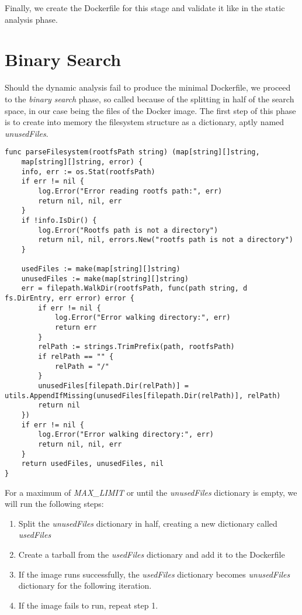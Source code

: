 Finally, we create the Dockerfile for this stage and validate it like in the static analysis phase.

\section{Binary Search}

Should the dynamic analysis fail to produce the minimal Dockerfile, we proceed to the \textit{binary search} phase, so called because of 
the splitting in half of the search space, in our case being the files of the Docker image.
The first step of this phase is to create into memory the filesystem structure as a dictionary, aptly named \textit{unusedFiles}.

\lstset{language=Go,caption=Filesystem parsing,label=lst:filesystem-parsing}
\begin{lstlisting}
func parseFilesystem(rootfsPath string) (map[string][]string,
	map[string][]string, error) {
	info, err := os.Stat(rootfsPath)
	if err != nil {
		log.Error("Error reading rootfs path:", err)
		return nil, nil, err
	}
	if !info.IsDir() {
		log.Error("Rootfs path is not a directory")
		return nil, nil, errors.New("rootfs path is not a directory")
	}

	usedFiles := make(map[string][]string)
	unusedFiles := make(map[string][]string)
	err = filepath.WalkDir(rootfsPath, func(path string, d fs.DirEntry, err error) error {
		if err != nil {
			log.Error("Error walking directory:", err)
			return err
		}
		relPath := strings.TrimPrefix(path, rootfsPath)
		if relPath == "" {
			relPath = "/"
		}
		unusedFiles[filepath.Dir(relPath)] = utils.AppendIfMissing(unusedFiles[filepath.Dir(relPath)], relPath)
		return nil
	})
	if err != nil {
		log.Error("Error walking directory:", err)
		return nil, nil, err
	}
	return usedFiles, unusedFiles, nil
}
\end{lstlisting}

For a maximum of \textit{MAX_LIMIT} or until the \textit{unusedFiles} dictionary is empty, we will run the following steps:
\begin{enumerate}
	\item Split the \textit{unusedFiles} dictionary in half, creating a new dictionary called \textit{usedFiles}
	\item Create a tarball from the \textit{usedFiles} dictionary and add it to the Dockerfile
	\item If the image runs successfully, the \textit{usedFiles} dictionary becomes \textit{unusedFiles} dictionary for the following iteration.
	\item If the image fails to run, repeat step 1.
\end{enumerate}

